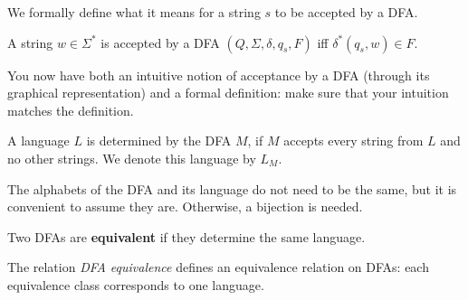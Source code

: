 
We formally define what it means for a string $s$ to be accepted by a
DFA.
\begin{definition} \label{defacceptdfa}
A string $w\in \Sigma^*$ is accepted by a DFA
$(Q,\Sigma,\delta,q_s,F)$ iff $\delta^*(q_s,w) \in F$.
\end{definition}

\begin{exercise}
You now have both an intuitive notion of acceptance by a DFA (through
its graphical representation) and a formal definition: make sure that
your intuition matches the definition.
\end{exercise}

\begin{definition}
A language $L$ is determined by the DFA $M$, if $M$ accepts every string
from $L$ and no other strings. We denote this language by $L_M$.
\end{definition}

The alphabets of the DFA and its language do not need to be the same,
but it is convenient to assume they are. Otherwise, a bijection is needed.

\begin{definition}
Two DFAs are {\bf equivalent} if they determine the same language.
\end{definition}

The relation {\em DFA equivalence} defines an equivalence relation on
DFAs: each equivalence class corresponds to one language.

